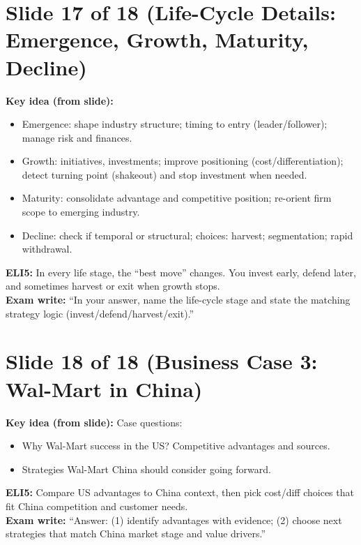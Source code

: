 \documentclass[11pt,a4paper]{article}
\begin{document}
\section*{Slide 17 of 18 (Life-Cycle Details: Emergence, Growth, Maturity, Decline)}
\textbf{Key idea (from slide):}
\begin{itemize}
  \item Emergence: shape industry structure; timing to entry (leader/follower); manage risk and finances.
  \item Growth: initiatives, investments; improve positioning (cost/differentiation); detect turning point (shakeout) and stop investment when needed.
  \item Maturity: consolidate advantage and competitive position; re-orient firm scope to emerging industry.
  \item Decline: check if temporal or structural; choices: harvest; segmentation; rapid withdrawal.
\end{itemize}
\textbf{ELI5:} In every life stage, the ``best move'' changes. You invest early, defend later, and sometimes harvest or exit when growth stops.\\
\textbf{Exam write:} ``In your answer, name the life-cycle stage and state the matching strategy logic (invest/defend/harvest/exit).''

\section*{Slide 18 of 18 (Business Case 3: Wal-Mart in China)}
\textbf{Key idea (from slide):} Case questions:
\begin{itemize}
  \item Why Wal-Mart success in the US? Competitive advantages and sources.
  \item Strategies Wal-Mart China should consider going forward.
\end{itemize}
\textbf{ELI5:} Compare US advantages to China context, then pick cost/diff choices that fit China competition and customer needs.\\
\textbf{Exam write:} ``Answer: (1) identify advantages with evidence; (2) choose next strategies that match China market stage and value drivers.''
\end{document}
